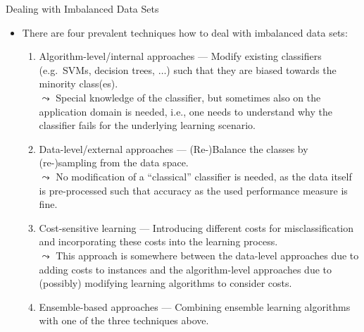 \documentclass[11pt,compress,t,notes=noshow, xcolor=table]{beamer}
\begin{document}
\begin{vbframe}{Dealing with Imbalanced Data Sets}
%
\footnotesize
  \begin{itemize}
  	\footnotesize
%    
    \item  There are four prevalent techniques how to deal with imbalanced data sets:
%	
	\begin{enumerate}
		\footnotesize
%		
		\item  Algorithm-level/internal approaches --- Modify existing classifiers (e.g.\ SVMs, decision trees, $\ldots$) such that they are biased towards the minority class(es). \\
%		
		$\leadsto$ Special knowledge of the classifier, but sometimes also on the application domain is needed, i.e., one needs to understand why the classifier fails for the underlying learning scenario.
%		
		\item Data-level/external approaches --- (Re-)Balance the classes by (re-)sampling from the data space.\\
%		
		$\leadsto$ No modification of a ``classical'' classifier is needed, as the data itself is pre-processed such that accuracy as the used performance measure is fine.
%		
		\item Cost-sensitive learning --- Introducing different costs for misclassification and incorporating these costs into the learning process. \\
%		
		$\leadsto$  This approach is somewhere between the data-level approaches due to adding costs to instances and the algorithm-level approaches due to (possibly) modifying learning algorithms to consider costs.
%		
		\item Ensemble-based approaches --- Combining ensemble learning algorithms with one of the three techniques above.
%
	\end{enumerate}
%
  \end{itemize}
%
\end{vbframe}


%
\endlecture
\end{document}
